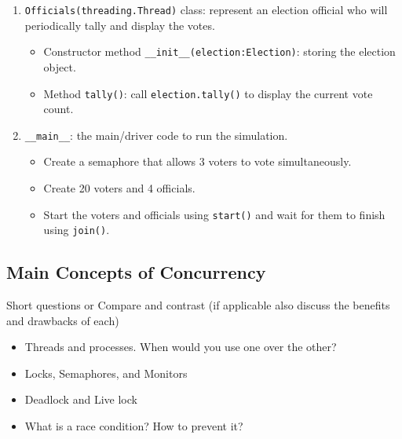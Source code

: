 \documentclass[oneside,11pt,dvipsnames]{book}
\newcommand{\code}[1]{\texttt{#1}}
\begin{document}
\begin{enumerate}
\item \code{Officials(threading.Thread)} class: represent an election official who will periodically tally and display the votes.
\begin{itemize}
    \item Constructor method \code{\_\_init\_\_(election:Election)}: storing the election object.
    \item Method \code{tally()}: call \code{election.tally()} to display the current vote count.
\end{itemize}
\item \code{\_\_main\_\_}: the main/driver code to run the simulation.
    \begin{itemize}
        \item Create a semaphore that allows 3 voters to vote simultaneously.
        \item Create 20 voters and 4 officials.
        \item Start the voters and officials using \code{start()} and wait for them to finish using \code{join()}.
    \end{itemize}
\end{enumerate}

\subsection{Main Concepts of Concurrency}\label{exercise:concurrency-concepts}

Short questions or Compare and contrast (if applicable also discuss the benefits and drawbacks of each) 
\begin{itemize}
    \item Threads and processes. When would you use one over the other?
    \item Locks, Semaphores, and Monitors
    \item Deadlock and Live lock
    \item What is a race condition? How to prevent it?
\end{itemize}



\end{document}
